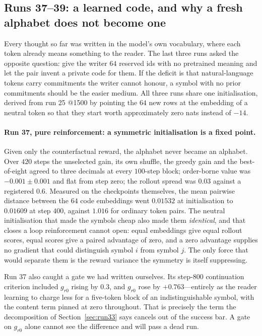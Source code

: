 \documentclass{article} %
\begin{document}
\subsection{Runs 37--39: a learned code, and why a fresh alphabet does not become one}
\label{sec:code}

Every thought so far was written in the model's own vocabulary, where each token already means
something to the reader. The last three runs asked the opposite question: give the writer $64$
reserved ids with no pretrained meaning and let the pair invent a private code for them. If the
deficit is that natural-language tokens carry commitments the writer cannot honour, a symbol with
no prior commitments should be the easier medium. All three runs share one initialisation, derived
from run 25 @1500 by pointing the $64$ new rows at the embedding of a neutral token so that they
start worth approximately zero nats instead of $-14$.

\paragraph{Run 37, pure reinforcement: a symmetric initialisation is a fixed point.} Given only
the counterfactual reward, the alphabet never became an alphabet. Over $420$ steps the unselected
gain, its own shuffle, the greedy gain and the best-of-eight agreed to three decimals at every
$100$-step block; order-borne value was $-0.001 \pm 0.001$ and flat from step zero; the rollout
spread was $0.03$ against a registered $0.6$. Measured on the checkpoints themselves, the mean
pairwise distance between the $64$ code embeddings went $0.01532$ at initialisation to $0.01609$
at step $400$, against $1.016$ for ordinary token pairs. The neutral initialisation that made the
symbols cheap also made them \emph{identical}, and that closes a loop reinforcement cannot open:
equal embeddings give equal rollout scores, equal scores give a paired advantage of zero, and a
zero advantage supplies no gradient that could distinguish symbol $i$ from symbol $j$. The only
force that would separate them is the reward variance the symmetry is itself suppressing.

Run 37 also caught a gate we had written ourselves. Its step-$800$ continuation criterion included
$g_{r0}$ rising by $0.3$, and $g_{r0}$ rose by $+0.763$---entirely as the reader learning to charge
less for a five-token block of an indistinguishable symbol, with the content term pinned at zero
throughout. That is precisely the term the decomposition of Section~\ref{sec:run33} says cancels
out of the success bar. A gate on $g_{r0}$ alone cannot see the difference and will pass a dead run.
\end{document}
